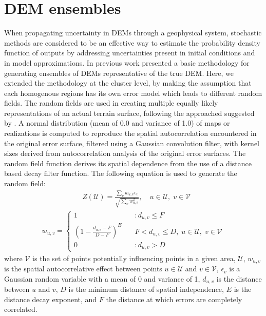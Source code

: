 \documentclass[12pt,letterpaper]{article}
\begin{document}
\section{DEM ensembles}
When propagating uncertainty in DEMs through a geophysical system, stochastic methods are considered to 
be an effective way to estimate the probability density function of outputs by addressing uncertainties present in 
initial conditions and in model approximations.
In previous work \cite{stefanescuPRS2012} presented a basic methodology for generating
ensembles of DEMs representative of the true DEM. Here, we extended the methodology at the cluster level, 
by making the assumption that each homogenous regions has its own error model which leads to different random 
fields. The random fields are used in creating multiple equally likely representations of an actual terrain
surface, following the approached suggested by \cite{Ehlschlaeger_1994}.
A normal distribution (mean of 0.0 and variance of 1.0) of maps or realizations is computed to reproduce the 
spatial autocorrelation encountered in the original error surface, filtered using a Gaussian convolution filter, with 
kernel sizes derived from autocorrelation analysis of the original error surfaces.
The random field function derives its spatial dependence from the use of a distance
based decay filter function. The following equation is used to
generate the random field:
\begin{align}
  &Z(\mathcal{U})= \frac{\sum_v w_{u,v}\epsilon_v}{\sqrt{\sum_v
      w_{u,v}^2}}, \quad u\in \mathcal{U}, \; v \in \mathcal{V}
 \label{eqn1}
 \end{align}
 \begin{align}
   w_{u,v} = \left\{ \begin{array}{ll} 1 & \quad :d_{u,v} \le F \\
       \left(1- \frac{d_{u,v} - F}{D - F} \right)^E & \quad F <
       d_{u,v} \le D, \; u \in \mathcal{U}, \; v \in \mathcal{V}\\ 0 &
       \quad :d_{u,v} > D
\end{array} \right.
\label{eqn2}                                                    
\end{align}
where $\mathcal{V}$ is the set of points potentially influencing
points in a given area, $\mathcal{U}$, $w_{u,v}$ is the spatial
autocorrelative effect between points $u \in \mathcal{U}$ and $v \in
\mathcal{V}$, $\epsilon_v$ is a Gaussian random variable with a mean of 0 and
variance of 1, $d_{u,v}$ is the distance between $u$ and $v$, $D$ is
the minimum distance of spatial independence, $E$ is the distance
decay exponent, and $F$ the distance at which errors are completely
correlated.
\end{document}
